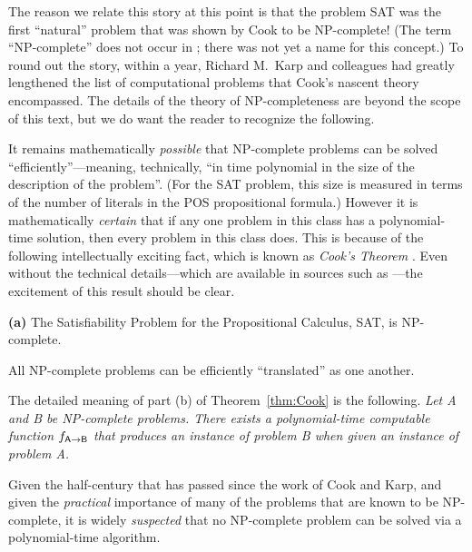 The reason we relate this story at this point is that the problem {\sf
  SAT} was the first ``natural'' problem that was shown by Cook to be
{\sf NP}-complete!  (The term ``{\sf NP}-complete'' does not occur in
\cite{Cook71}; there was not yet a name for this concept.)  To round
out the story, within a year, Richard M.~Karp 
and colleagues had greatly lengthened the list of computational
problems that Cook's nascent theory encompassed.  The details of the
theory of {\sf NP}-completeness are beyond the scope of this text, but
we do want the reader to recognize the following.

It remains mathematically {\em possible} that {\sf NP}-complete
problems can be solved ``efficiently''---meaning, technically, ``in
time polynomial in the size of the description of the problem''.  (For
the {\sf SAT} problem, this size is measured in terms of the number of
literals in the POS propositional formula.)  However it is
mathematically {\em certain} that if any one problem in this class has
a polynomial-time solution, then every problem in this class does.
This is because of the following intellectually exciting fact, which
is known as {\it Cook's Theorem} .  Even without
the technical details---which are available in sources such as
\cite{GareyJ79,Rosenberg09}---the excitement of this result should be
clear.

\begin{theorem}
\label{thm:Cook}
{\bf (a)}
The Satisfiability Problem for the Propositional Calculus, {\sf SAT},
is {\sf NP}-complete.

All {\sf NP}-complete problems can be efficiently ``translated'' as
one another.
\end{theorem}

The detailed meaning of part (b) of Theorem~\ref{thm:Cook} is the
following.  {\em Let {\sf A} and {\sf B} be {\sf NP}-complete
  problems.  There exists a polynomial-time computable function
  $f_{{\sf A} \rightarrow {\sf B}}$ that produces an instance of
  problem {\sf B} when given an instance of problem {\sf A}.}

\medskip

Given the half-century that has passed since the work of Cook and
Karp, and given the {\em practical} importance of many of the problems
that are known to be {\sf NP}-complete, it is widely {\em suspected}
that no {\sf NP}-complete problem can be solved via a polynomial-time
algorithm.

